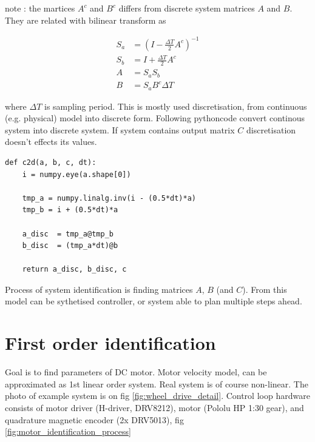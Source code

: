 \documentclass[12pt,twoside,onecolumn,openany,extrafontsizes,dvipsnames]{memoir}
\begin{document}
        note : the martices $A^c$ and $B^c$ differs from discrete system matrices $A$ and $B$.
        They are related with bilinear transform as 
        
        \begin{align}
            S_a &= (I - \frac{\Delta T}{2}A^c)^{-1} \nonumber \\
            S_b &= I + \frac{\Delta T}{2}A^c \nonumber \\
            A &=  S_aS_b  \\
            B &= S_a B^c \Delta T 
        \end{align}

        where $\Delta T$ is sampling period. This is mostly used discretisation, 
        from continuous (e.g. physical) model into discrete form.
        Following pythoncode convert continous system into discrete system. 
        If system contains output matrix $C$ discretisation doesn't effects its values.
       
        \begin{lstlisting}[style=python_style]
def c2d(a, b, c, dt):
    i = numpy.eye(a.shape[0])
    
    tmp_a = numpy.linalg.inv(i - (0.5*dt)*a)
    tmp_b = i + (0.5*dt)*a

    a_disc  = tmp_a@tmp_b
    b_disc  = (tmp_a*dt)@b

    return a_disc, b_disc, c
        \end{lstlisting}
       
        Process of system identification is finding matrices $A$, $B$ (and $C$). From this model 
        can be sythetised controller, or system able to plan multiple steps ahead.

    \section{First order identification}   
        Goal is to find parameters of DC motor. Motor velocity model, can be approximated as 1st linear order system. 
        Real system is of course non-linear. The photo of example system is on fig \ref{fig:wheel_drive_detail}.
        Control loop hardware consists of motor driver (H-driver, DRV8212), motor (Pololu HP 1:30 gear), and quadrature magnetic encoder (2x DRV5013),
        fig \ref{fig:motor_identification_process}
\end{document}
